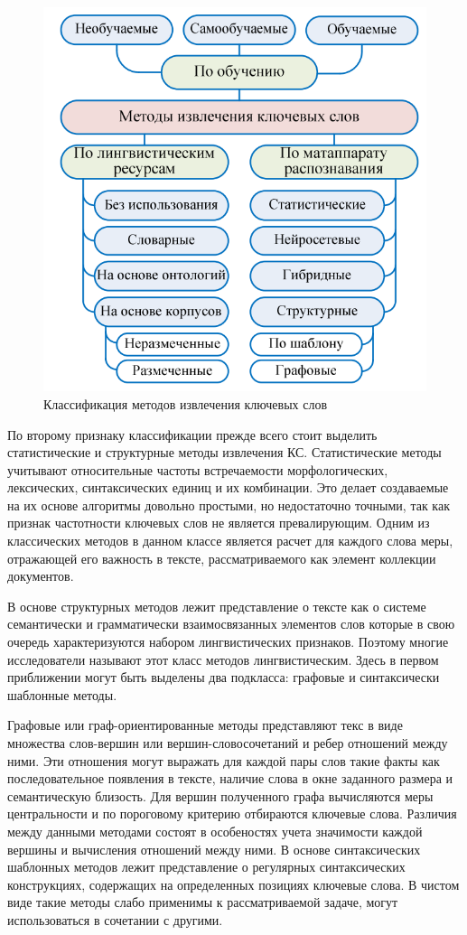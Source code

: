 \begin{figure}[h!]
	\centering
	\includegraphics[width=0.7\linewidth]{src/img/ke_types}
	\caption[]{Классификация методов извлечения ключевых слов}
	\label{fig:ketypes}
\end{figure}

По второму признаку классификации прежде всего стоит выделить статистические и структурные методы извлечения КС.
Статистические методы учитывают относительные частоты встречаемости морфологических, лексических, синтаксических единиц и их комбинации.
Это делает создаваемые на их основе алгоритмы довольно простыми, но недостаточно точными, так как признак частотности ключевых слов не является превалирующим.
Одним из классических методов в данном классе является расчет для каждого слова меры, отражающей его важность в тексте, рассматриваемого как элемент коллекции документов.

В основе структурных методов лежит представление о тексте как о системе семантически и грамматически взаимосвязанных элементов слов которые в свою очередь характеризуются набором лингвистических признаков.
Поэтому многие исследователи называют этот класс методов лингвистическим.
Здесь в первом приближении могут быть выделены два подкласса: графовые и синтаксически шаблонные методы.

Графовые или граф-ориентированные методы представляют текс в виде множества слов-вершин или вершин-словосочетаний и ребер отношений между ними.
Эти отношения могут выражать для каждой пары слов такие факты как последовательное появления в тексте, наличие слова в окне заданного размера и семантическую близость.
Для вершин полученного графа вычисляются меры центральности и по пороговому критерию отбираются ключевые слова.
Различия между данными методами состоят в особеностях учета значимости каждой вершины и вычисления отношений между ними.
В основе синтаксических шаблонных методов лежит представление о регулярных синтаксических конструкциях, содержащих на определенных позициях ключевые слова.
В чистом виде такие методы слабо применимы к рассматриваемой задаче, могут использоваться в сочетании с другими.

